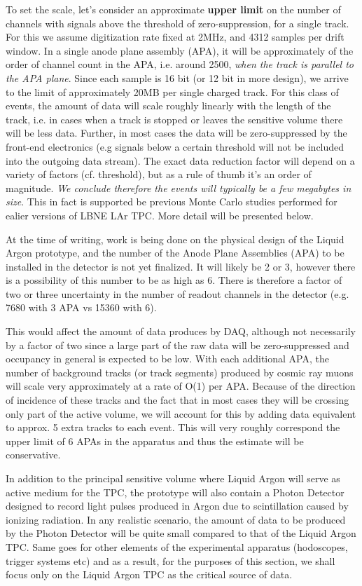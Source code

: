 To set the scale, let's consider an approximate \textbf{upper limit} on the number of channels with signals above the threshold
of zero-suppression, for a single track. For this we assume digitization rate fixed at 2MHz, and 4312 samples per drift window. In a single
anode plane assembly (APA), it will be approximately of the order of channel count in the APA, i.e. around 2500, \textit{when the track is parallel to the APA plane}.
Since each sample is 16 bit (or 12 bit in more design), we arrive to the limit of approximately 20MB per single charged track.
For this class of events, the amount of data will scale roughly linearly with the length of the track, i.e. in cases when a track is stopped or leaves the sensitive volume
there will be less data. Further, in most cases the data will be zero-suppressed by the front-end electronics (e.g signals below a certain threshold
will not be included into the outgoing data stream). The exact data reduction factor will depend on a variety of factors (cf. threshold), but as a rule of
thumb it's an order of magnitude. \textit{We conclude therefore the events will typically be a few megabytes in size}. This in fact is supported
be previous Monte Carlo studies performed for ealier versions of LBNE LAr TPC. More detail will be presented below.

At the time of writing, work is being done on the physical design of the Liquid Argon prototype, and the number of the Anode Plane Assemblies (APA)
to be installed in the detector is not yet finalized. It will likely be 2 or 3, however there is a possibility of this number to be as high as 6.  There is therefore a
factor of two or three  uncertainty in the number of readout channels in the detector (e.g. 7680 with 3 APA vs 15360 with 6).

This would affect the amount of data produces by DAQ, although not necessarily by a factor of two since a large part of the raw data will be zero-suppressed
and occupancy in general is expected to be low. With each additional APA, the number of background tracks (or track segments) produced by cosmic ray
muons will scale very approximately at a rate of O(1) per APA. Because of the direction of incidence of these tracks and the fact that in most cases they will
be crossing only part of the active volume, we will account for this by adding data equivalent to approx. 5 extra tracks to each event. This will very roughly correspond
the upper limit of 6 APAs in the apparatus and thus the estimate will be conservative.

In addition to the principal sensitive volume where Liquid Argon will serve as active medium for the TPC, the prototype will also contain a Photon Detector designed
to record light pulses produced in Argon due to scintillation caused by ionizing radiation. In any realistic scenario, the amount of data to be produced by
the Photon Detector will be quite small compared to that of the Liquid Argon TPC. Same goes for other elements of the experimental apparatus (hodoscopes,
trigger systems etc) and as a result, for the purposes of this section, we shall focus only on the Liquid Argon TPC as the critical source of data.


